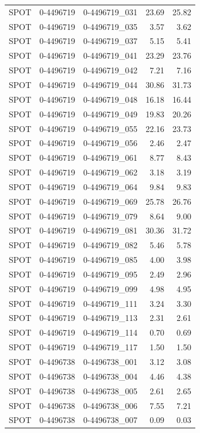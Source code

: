 \begin{tabular}{lllrr}
SPOT & 0-4496719 & 0-4496719_031 & 23.69 & 25.82 \\
SPOT & 0-4496719 & 0-4496719_035 & 3.57 & 3.62 \\
SPOT & 0-4496719 & 0-4496719_037 & 5.15 & 5.41 \\
SPOT & 0-4496719 & 0-4496719_041 & 23.29 & 23.76 \\
SPOT & 0-4496719 & 0-4496719_042 & 7.21 & 7.16 \\
SPOT & 0-4496719 & 0-4496719_044 & 30.86 & 31.73 \\
SPOT & 0-4496719 & 0-4496719_048 & 16.18 & 16.44 \\
SPOT & 0-4496719 & 0-4496719_049 & 19.83 & 20.26 \\
SPOT & 0-4496719 & 0-4496719_055 & 22.16 & 23.73 \\
SPOT & 0-4496719 & 0-4496719_056 & 2.46 & 2.47 \\
SPOT & 0-4496719 & 0-4496719_061 & 8.77 & 8.43 \\
SPOT & 0-4496719 & 0-4496719_062 & 3.18 & 3.19 \\
SPOT & 0-4496719 & 0-4496719_064 & 9.84 & 9.83 \\
SPOT & 0-4496719 & 0-4496719_069 & 25.78 & 26.76 \\
SPOT & 0-4496719 & 0-4496719_079 & 8.64 & 9.00 \\
SPOT & 0-4496719 & 0-4496719_081 & 30.36 & 31.72 \\
SPOT & 0-4496719 & 0-4496719_082 & 5.46 & 5.78 \\
SPOT & 0-4496719 & 0-4496719_085 & 4.00 & 3.98 \\
SPOT & 0-4496719 & 0-4496719_095 & 2.49 & 2.96 \\
SPOT & 0-4496719 & 0-4496719_099 & 4.98 & 4.95 \\
SPOT & 0-4496719 & 0-4496719_111 & 3.24 & 3.30 \\
SPOT & 0-4496719 & 0-4496719_113 & 2.31 & 2.61 \\
SPOT & 0-4496719 & 0-4496719_114 & 0.70 & 0.69 \\
SPOT & 0-4496719 & 0-4496719_117 & 1.50 & 1.50 \\
SPOT & 0-4496738 & 0-4496738_001 & 3.12 & 3.08 \\
SPOT & 0-4496738 & 0-4496738_004 & 4.46 & 4.38 \\
SPOT & 0-4496738 & 0-4496738_005 & 2.61 & 2.65 \\
SPOT & 0-4496738 & 0-4496738_006 & 7.55 & 7.21 \\
SPOT & 0-4496738 & 0-4496738_007 & 0.09 & 0.03 \\

\end{tabular}
